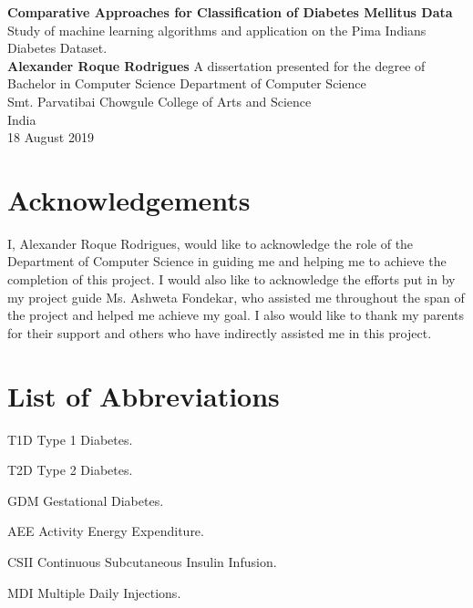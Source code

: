 \documentclass[12pt]{article}
\begin{document}
\begin{titlepage}
    \begin{center}
        \vspace*{1cm} 
        \Huge
        \textbf{Comparative Approaches for Classification of Diabetes Mellitus Data} 
        \vspace{0.5cm}
        \normalsize
        \vspace{0cm}
        \\
        Study of machine learning algorithms and application on the Pima Indians Diabetes Dataset. 
        \vspace{1.5cm} 
        \\
        \textbf{Alexander Roque Rodrigues} 
        \vfill 
        A dissertation presented for the degree of\\
        Bachelor in Computer Science 
        \vspace{0.8cm}
        \Large
        Department of Computer Science\\        
        Smt. Parvatibai Chowgule College of Arts and Science\\
        India\\
        18 August 2019 
    \end{center}
\end{titlepage}
\Huge
\newpage
\huge
\normalsize
\tableofcontents

\newpage
\part{Acknowledgements}
I, Alexander Roque Rodrigues, would like to acknowledge the role of the Department of Computer Science in guiding me and helping me to achieve the completion of this project. I would also like to acknowledge the efforts put in by my project guide Ms. Ashweta Fondekar, who assisted me throughout the span of the project and helped me achieve my goal. I also would like to thank my parents for their support and others who have indirectly assisted me in this project.


\newpage
{}
 
\part{List of Abbreviations}
\begin{abbrv}
 
\item[T1D]			Type 1 Diabetes.
\item[T2D]			Type 2 Diabetes.
\item[GDM]			Gestational Diabetes.
\item[AEE]			Activity Energy Expenditure.
\item[CSII] 		Continuous Subcutaneous Insulin Infusion.
\item[MDI] 			Multiple Daily Injections.
\end{abbrv}
\end{document}
